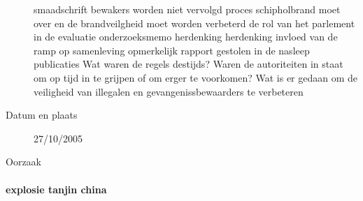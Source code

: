 \begin{description}
smaadschrift
bewakers worden niet vervolgd
proces schipholbrand moet over en de brandveilgheid moet worden verbeterd
de rol van het parlement in de evaluatie
\cite{parlementairemonitorschipholbrand}
onderzoeksmemo
herdenking
herdenking
invloed van de ramp op samenleving
\cite{videonpoNOVA13112008}
opmerkelijk rapport gestolen in de nasleep
\cite{rizoomes01052014schipholbrand}
publicaties
\cite{heuvelkroesschipholbrandcamerabeelden}
Wat waren de regels destijds?
Waren de autoriteiten in staat om op tijd in te grijpen of om erger te voorkomen?
Wat is er gedaan om de veiligheid van illegalen en gevangenissbewaarders te verbeteren
\item[Datum en plaats] 27/10/2005
\item[Oorzaak]
\end{description}



\paragraph{explosie tanjin china }

